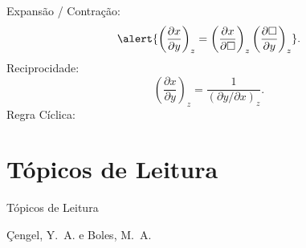     \begin{frame}\vspace*{-2em}
        Expansão / Contração:
        \begin{equation*}
            \alert{\left(
                \frac{\partial x}{\partial y}
            \right)_z =
            \left(
                \frac{\partial x}{\partial\square}
            \right)_z
            \left(
                \frac{\partial\square}{\partial y}
            \right)_z}.
        \end{equation*}
        Reciprocidade:
        \begin{equation}
            \left(
                \frac{\partial x}{\partial y}
            \right)_z =
            \frac{1}{(\partial y/\partial x)_z}.
        \end{equation}
        Regra Cíclica:
    \end{frame}

\section{Tópicos de Leitura}

    \begin{frame}[allowframebreaks]{Tópicos de Leitura}
        \begin{thebibliography}{Çengel, Y.~A., 2013}
                Çengel, Y.~A. e Boles, M.~A.
        \end{thebibliography}
    \end{frame}




